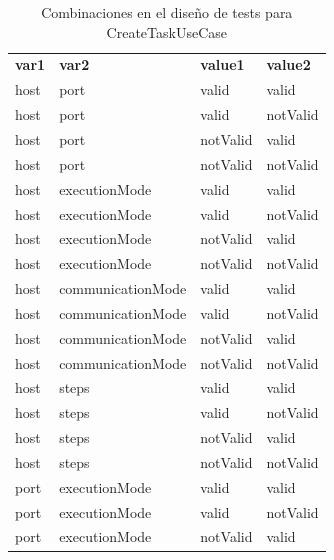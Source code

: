 \begin{table}[H]
    \caption{Combinaciones en el diseño de tests para CreateTaskUseCase}\label{tab:combCreateTaskUseCase}
    \small
    \begin{tabular}{llll}
        \textbf{var1}          & \textbf{var2}     & \textbf{value1} & \textbf{value2} \\
        host          & port              & valid           & valid           \\
        host          & port              & valid           & notValid        \\
        host          & port              & notValid        & valid           \\
        host          & port              & notValid        & notValid        \\
        host          & executionMode     & valid           & valid           \\
        host          & executionMode     & valid           & notValid        \\
        host          & executionMode     & notValid        & valid           \\
        host          & executionMode     & notValid        & notValid        \\
        host          & communicationMode & valid           & valid           \\
        host          & communicationMode & valid           & notValid        \\
        host          & communicationMode & notValid        & valid           \\
        host          & communicationMode & notValid        & notValid        \\
        host          & steps             & valid           & valid           \\
        host          & steps             & valid           & notValid        \\
        host          & steps             & notValid        & valid           \\
        host          & steps             & notValid        & notValid        \\
        port          & executionMode     & valid           & valid           \\
        port          & executionMode     & valid           & notValid        \\
        port          & executionMode     & notValid        & valid           \\

\end{tabular}
\end{table}
